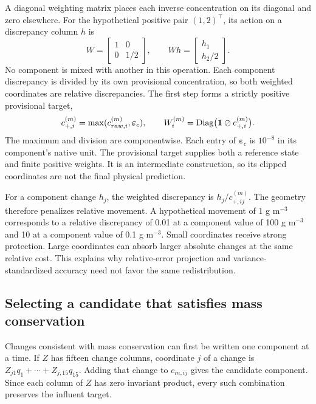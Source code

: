 A diagonal weighting matrix places each inverse concentration on its diagonal and zero elsewhere. For the hypothetical positive pair $(1,2)^\top$, its action on a discrepancy column $h$ is
\[
W=\begin{bmatrix}1&0\\0&1/2\end{bmatrix},\qquad
Wh=\begin{bmatrix}h_1\\h_2/2\end{bmatrix}.
\]
No component is mixed with another in this operation. Each component discrepancy is divided by its own provisional concentration, so both weighted coordinates are relative discrepancies. The first step forms a strictly positive provisional target,
\begin{equation}
\equationname{Positive provisional target and relative projection weights}
c_{+,i}^{(m)}=\max(c_{raw,i}^{(m)},\boldsymbol{\varepsilon}_c),\qquad
W_i^{(m)}=\operatorname{Diag}\bigl(\mathbf{1}\oslash c_{+,i}^{(m)}\bigr).
\label{eq:projection_positive_target}
\end{equation}
The maximum and division are componentwise. Each entry of $\boldsymbol{\varepsilon}_c$ is $10^{-8}$ in its component's native unit. The provisional target supplies both a reference state and finite positive weights. It is an intermediate construction, so its clipped coordinates are not the final physical prediction.

For a component change $h_j$, the weighted discrepancy is $h_j/c_{+,ij}^{(m)}$. The geometry therefore penalizes relative movement. A hypothetical movement of 1 g m$^{-3}$ corresponds to a relative discrepancy of 0.01 at a component value of 100 g m$^{-3}$ and 10 at a component value of 0.1 g m$^{-3}$. Small coordinates receive strong protection. Large coordinates can absorb larger absolute changes at the same relative cost. This explains why relative-error projection and variance-standardized accuracy need not favor the same redistribution.

\subsection{Selecting a candidate that satisfies mass conservation}

Changes consistent with mass conservation can first be written one component at a time. If $Z$ has fifteen change columns, coordinate $j$ of a change is $Z_{j1}q_1+\cdots+Z_{j,15}q_{15}$. Adding that change to $c_{in,ij}$ gives the candidate component. Since each column of $Z$ has zero invariant product, every such combination preserves the influent target.

